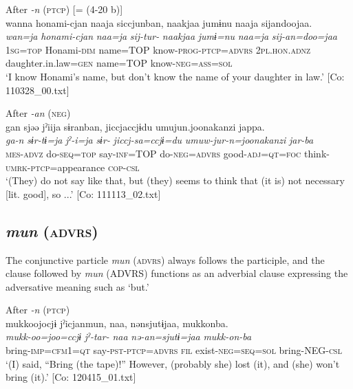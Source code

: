 \ea\label{ex:10.30} 
\ea After \textit{-n} (\textsc{ptcp}) [= (4-20 b)]\\
      \glll    wanna  honami-{\textbar}cjan{\textbar}  naaja  siccjunban, naakjaa  jumɨnu  naaja  sijandoojaa.\\
    \textit{wan=ja}  \textit{honami-cjan}  \textit{naa=ja}  \textit{sij-tur-}  \textit{naakjaa}  \textit{jumɨ=nu}  \textit{naa=ja}  \textit{sij-an=doo=jaa}\\
    1\textsc{sg}=\textsc{top}  Honami-\textsc{dim}  name=TOP  know-\textsc{prog}-\textsc{ptcp}=\textsc{advrs}  2\textsc{pl}.\textsc{hon}.\textsc{adnz}  daughter.in.law=\textsc{gen}  name=TOP  know-\textsc{neg}=\textsc{ass}=\textsc{sol}\\
\glt     ‘I know Honami’s name, but don’t know the name of your daughter in law.’  [Co: 110328\_00.txt]

  \ex After \textit{-an} (\textsc{neg})\\
      \glll    gan  sjəə  jˀiija  sɨranban,  jiccjaccjɨdu  umujun.{\textbar}joonakanzi{\textbar}  jappa.\\
    \textit{ga-n}  \textit{sɨr-tɨ=ja}  \textit{jˀ-i=ja}  \textit{sɨr-}     \textit{jiccj-sa=ccjɨ=du}  \textit{umuw-jur-n=joonakanzi}  \textit{jar-ba}\\
    \textsc{mes}-\textsc{advz}  do-\textsc{seq}=\textsc{top}  say-\textsc{inf}=TOP  do-\textsc{neg}=\textsc{advrs}  good-\textsc{adj}=\textsc{qt}=\textsc{foc}  think-\textsc{umrk}-\textsc{ptcp}=appearance  \textsc{cop}-\textsc{csl}\\
\glt     ‘(They) do not say like that, but (they) seems to think that (it is) not necessary [lit. good], so ...’  [Co: 111113\_02.txt]
\z
\z

\subsection{\textit{mun} (\textsc{advrs})}\label{sec:10.2.2}

The conjunctive particle \textit{mun} (\textsc{advrs}) always follows the participle, and the clause followed by \textit{mun} (ADVRS) functions as an adverbial clause expressing the adversative meaning such as ‘but.’

\ea\label{ex:10.31}  
  \ea
  \exi{} After \textit{{}-n} (\textsc{ptcp})\\
  \ex  %
      \glll    mukkoojocjɨ  jˀicjanmun,  naa,  nənsjutɨjaa,  mukkonba.      \\
      \textit{mukk-oo=joo=ccjɨ}  \textit{jˀ-tar-}  \textit{naa}  \textit{nə-an=sjutɨ=jaa}    \textit{mukk-on-ba}      \\
      bring-\textsc{imp}=\textsc{cfm}1=\textsc{qt}  say-\textsc{pst}-\textsc{ptcp}=\textsc{advrs}  \textsc{fil}  exist-\textsc{neg}=\textsc{seq}=\textsc{sol}   bring-NEG-\textsc{csl}     \\
      \glt       ‘(I) said, “Bring (the tape)!” However, (probably she) lost (it), and (she) won’t bring (it).’ [Co: 120415\_01.txt]

